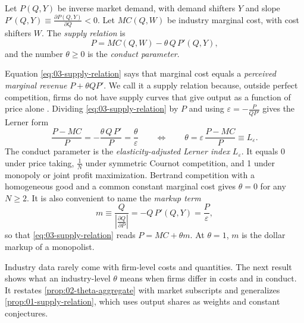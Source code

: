 \begin{definition}\label{def:03-supply-relation}
Let $P(Q, Y)$ be inverse market demand, with demand shifters $Y$ and slope
$P'(Q, Y) \equiv \frac{\partial P(Q, Y)}{\partial Q} < 0$. Let $MC(Q, W)$ be industry marginal cost, with cost
shifters $W$. The \emph{supply relation} is
\begin{equation}\label{eq:03-supply-relation}
P = MC(Q, W) - \theta\, Q\, P'(Q, Y),
\end{equation}
and the number $\theta \ge 0$ is the \emph{conduct parameter}.
\end{definition}

Equation \eqref{eq:03-supply-relation} says that marginal cost equals a \emph{perceived marginal revenue}
$P + \theta Q P'$. We call it a supply relation because, outside perfect competition, firms do not have supply curves
that give output as a function of price alone \citep[p.~1016]{Bresnahan1989}. Dividing
\eqref{eq:03-supply-relation} by $P$ and using $\varepsilon = -\frac{P}{Q P'}$ gives the Lerner form
\begin{equation}\label{eq:03-lerner-theta}
\frac{P - MC}{P} = -\frac{\theta\, Q\, P'}{P} = \frac{\theta}{\varepsilon}
\qquad\Longleftrightarrow\qquad
\theta = \varepsilon\,\frac{P - MC}{P} \equiv L_\varepsilon .
\end{equation}
The conduct parameter is the \emph{elasticity-adjusted Lerner index} $L_\varepsilon$. It equals 0 under price taking,
$\frac{1}{N}$ under symmetric Cournot competition, and 1 under monopoly or joint profit maximization. Bertrand
competition with a homogeneous good and a common constant marginal cost gives $\theta = 0$ for any $N \ge 2$. It is also
convenient to name the \emph{markup term}
\begin{equation*}
m \equiv \frac{Q}{\left\lvert \frac{\partial Q}{\partial P}\right\rvert} = -Q\,P'(Q, Y) = \frac{P}{\varepsilon},
\end{equation*}
so that \eqref{eq:03-supply-relation} reads $P = MC + \theta m$. At $\theta = 1$, $m$ is the dollar markup of a
monopolist.

Industry data rarely come with firm-level costs and quantities. The next result shows what an industry-level
$\theta$ means when firms differ in costs and in conduct. It restates \cref{prop:02-theta-aggregate} with market
subscripts and generalizes \cref{prop:01-supply-relation}, which uses output shares as weights and constant conjectures.

